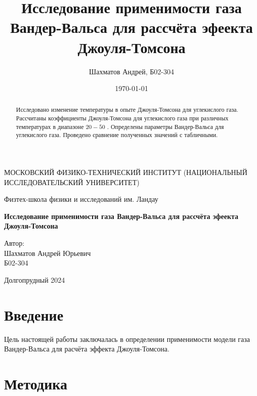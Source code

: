 \documentclass[12pt]{article}
\title{Исследование применимости газа Вандер-Вальса для рассчёта эфеекта Джоуля-Томсона}
\author{Шахматов Андрей, Б02-304}
\date{\today}
\begin{document}
\begin{titlepage}
    \begin{center}
        {\large МОСКОВСКИЙ ФИЗИКО-ТЕХНИЧЕСКИЙ ИНСТИТУТ (НАЦИОНАЛЬНЫЙ ИССЛЕДОВАТЕЛЬСКИЙ УНИВЕРСИТЕТ)}
    \end{center}
    \begin{center}
        {\large Физтех-школа физики и исследований им. Ландау}
    \end{center}
    
    
    \vspace{3cm}
    {\huge
        \begin{center}
            \textbf{Исследование применимости газа Вандер-Вальса для рассчёта эфеекта Джоуля-Томсона}
        \end{center}
    }
    \vspace{2cm}
    \begin{flushright}
        {\LARGE Автор:\\ Шахматов Андрей Юрьевич \\
            \vspace{0.2cm}
            Б02-304}
    \end{flushright}
    \vspace{7 cm}
    \begin{center}
        Долгопрудный 2024
    \end{center}
\end{titlepage}


\begin{abstract}
    Исследовано изменение температуры в опыте Джоуля-Томсона для углекислого газа. Рассчитаны 
    коэффициенты Джоуля-Томсона для углекислого газа при различных температурах в диапазоне $20 - 50$
    \textcelsius. Определены параметры Вандер-Вальса для углекислого газа. Проведено сравнение 
    полученных значений с табличными.      
\end{abstract}
\tableofcontents

\section{Введение}
Цель настоящей работы заключалась в определении применимости модели газа Вандер-Вальса для расчёта 
эффекта Джоуля-Томсона.  

\section{Методика}
\end{document}
